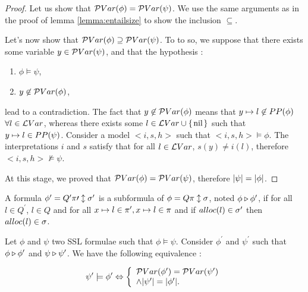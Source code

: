 \begin{proof}

Let us show that $\mathcal{P}Var(\phi)=\mathcal{P}Var(\psi)$.
We use the same arguments as in the proof of lemma \ref{lemma:entailsize}
to show the inclusion $\subseteq$.

Let's now show that $\mathcal{P}Var(\phi) \supseteq \mathcal{P}Var(\psi)$.
To to so, we suppose that there exists some variable $y \in \mathcal{P}Var(\psi)$, and
that the hypothesis :
\begin{enumerate}
\item $\phi \models \psi$,
\item $y\not\in \mathcal{P}Var(\phi)$,
\end{enumerate}
lead to a contradiction.
The fact that $y\not\in\mathcal{P}Var(\phi)$ means that $y \mapsto l\not\in PP(\phi)$ $\forall l\in\mathcal{L}Var$, whereas there exists some $l\in \LVar \cup \lbrace \nil \rbrace$ such that $y \mapsto l\in PP(\psi)$.
Consider a model $<i,s,h>$ such that $<i,s,h>\models \phi$. 
The interpretations $i$ and $s$ satisfy that for all $l\in \mathcal{L}Var$, $s(y)\neq i(l)$,
therefore $<i,s,h>\not\models \psi$.

At this stage, we proved that $\mathcal{P}Var(\phi)=\mathcal{P}Var(\psi)$, therefore $|{\psi}|=|{\phi}|$.
\end{proof}


\begin{definition}[Subformula]
A formula $\phi^{\prime}=Q^{\prime} \pi{\prime} \updownarrow \sigma^{\prime}$ is a subformula of $\phi=Q \pi \updownarrow \sigma$, noted $\phi \triangleright \phi^{\prime}$, if for all $l\in Q^{\prime}$, $l\in Q$ and for all $x \mapsto l\in \pi^{\prime}, x \mapsto l\in \pi$ and
if $alloc(l)\in \sigma^{\prime}$ then $alloc(l) \in \sigma$.
\end{definition}


\begin{lemma}
\label{lemma:modelsubfcns}
Let $\phi$ and $\psi$ two SSL formulae such that $\phi \models \psi$. Consider $\phi^{\prime}$ and $\psi^{\prime}$ such that $\phi \triangleright \phi^{\prime}$ and $\psi \triangleright \psi^{\prime}$.
We have the following equivalence :

$$\psi^{\prime} \models \phi^{\prime} \Leftrightarrow \left \lbrace \begin{array}{l} \mathcal{P}Var(\phi^{\prime}) = \mathcal{P}Var(\psi^{\prime}) \\ 
\wedge |{\psi^{\prime}}|=|{\phi^{\prime}}|. 
\end{array} \right .
$$

\end{lemma}

